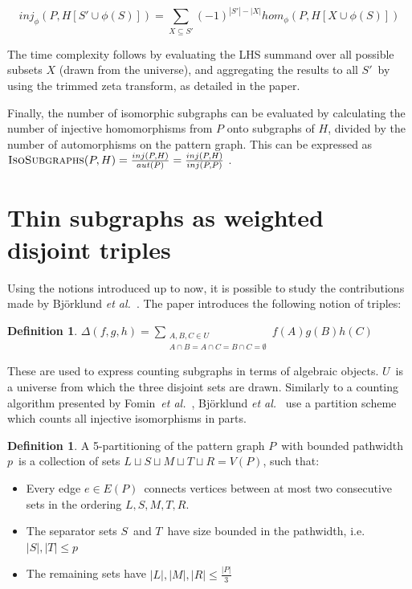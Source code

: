\documentclass[a4paper,11pt]{report}
\theoremstyle{plain}
\theoremstyle{definition}
\newtheorem{defn}[thm]{Definition} %
\begin{document}
\begin{equation}
inj_{\phi}(P, H[S' \cup \phi(S)]) = \sum_{X \subseteq S'} (-1)^{|S'|-|X|} hom_\phi(P, H[X \cup \phi(S)])
\end{equation}

The time complexity follows by evaluating the LHS summand over all possible subsets $X$ (drawn from the universe), and aggregating the results to all $S'$ by using the trimmed zeta transform, as detailed in the paper.

Finally, the number of isomorphic subgraphs can be evaluated by calculating the number of injective homomorphisms from $P$ onto subgraphs of $H$, divided by the number of automorphisms on the pattern graph.
This can be expressed as $\textsc{IsoSubgraphs}(P, H) = \frac{inj(P, H)}{aut(P)} = \frac{inj(P, H)}{inj(P, P)}$ \cite{FLRRS12}.

\section{Thin subgraphs as weighted disjoint triples}
Using the notions introduced up to now, it is possible to study the contributions made by Bj\"orklund \emph{et al.}~\cite{BHKK13}.
The paper introduces the following notion of triples:

\begin{defn}
\label{def:delta}
$\Delta(f, g, h) = \sum_{\substack{A, B, C \in U\\A \cap B = A \cap C = B \cap C = \emptyset}} f(A)g(B)h(C)$
\end{defn}

These are used to express counting subgraphs in terms of algebraic objects. $U$ is a universe from which the three disjoint sets are drawn.
Similarly to a counting algorithm presented by Fomin~\emph{et al.}~\cite{FLRRS12}, Bj\"orklund \emph{et al.}~\cite{BHKK13} use a partition scheme which counts all injective isomorphisms in parts.

\begin{defn}
A 5-partitioning of the pattern graph $P$ with bounded pathwidth $p$ is a collection of sets $L \sqcup S \sqcup M \sqcup T \sqcup R = V(P)$, such that:
\begin{itemize}
\item Every edge $e \in E(P)$ connects vertices between at most two consecutive sets in the ordering $L, S, M, T, R$.
\item The separator sets $S$ and $T$ have size bounded in the pathwidth, i.e. $|S|, |T| \leq p$
\item The remaining sets have $|L|, |M|, |R| \leq \frac{|P|}{3}$
\end{itemize}
\end{defn}
\end{document}
